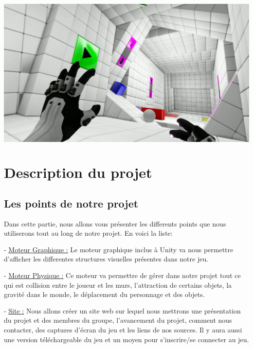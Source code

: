 \documentclass[a4paper]{article}
\begin{document}
\quad
\quad

\begin{centering}

\includegraphics[scale=0.3]{qube.jpg}

\end{centering}

\newpage
\section{Description du projet}
	\subsection{Les points de notre projet}
Dans cette partie, nous allons vous présenter les differents points que nous utiliserons tout au long de notre projet. En voici la liste:

\quad

- \underline{Moteur Graphique :} Le moteur graphique inclus à Unity va nous permettre d’afficher les differentes structures visuelles présentes dans notre jeu.

\quad 

- \underline{Moteur Physique :} Ce moteur va permettre de gérer dans notre projet tout ce qui est collision entre le joueur et les murs, l’attraction de certains objets, la gravité dans le monde, le déplacement du personnage et des objets.

\quad

- \underline{Site :} Nous allons créer un site web sur lequel nous mettrons une présentation du projet et des membres du groupe, l’avancement du projet, comment nous contacter, des captures d’écran du jeu et les liens de nos sources. Il y aura aussi une version téléchargeable du jeu et un moyen pour s’inscrire/se connecter au jeu.
\end{document}
